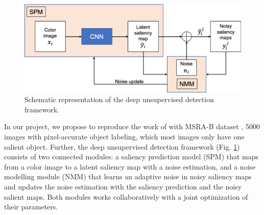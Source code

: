 \documentclass{article}
\begin{document}
\begin{figure}[h]
  \centering
  \includegraphics[width=0.4\linewidth]{fig1.png}
  \caption{Schematic representation of the deep unsupervised detection framework.}
  \label{fig:scheme}
\end{figure}

In our project, we propose to reproduce the work of \cite{zhang2018} with MSRA-B dataset \cite{wang2017}, 5000 images with pixel-accurate object labeling, which most  images only have one salient object. Further, the deep unsupervised detection framework (Fig. \ref{fig:scheme}) consists of two connected modules: a saliency prediction model (SPM) that maps from a color image to a latent saliency map with a noise estimation, and a noise modelling module (NMM)  that learns an adaptive noise in noisy saliency maps and updates the noise estimation with the saliency prediction and the noisy salient maps. Both modules works collaboratively with a joint optimization of their parameters. 


\printbibliography
\end{document}
